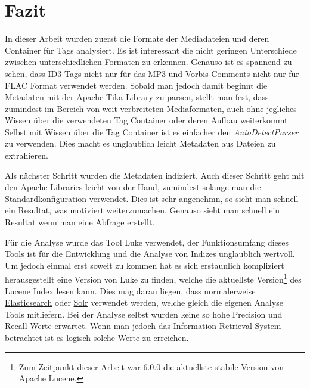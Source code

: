 \chapter{Fazit}
In dieser Arbeit wurden zuerst die Formate der Mediadateien
und deren Container für Tags analysiert. Es ist interessant
die nicht geringen Unterschiede zwischen unterschiedlichen
Formaten zu erkennen. Genauso ist es spannend zu sehen,
dass ID3 Tags nicht nur für das MP3 und Vorbis Comments nicht
nur für FLAC Format verwendet werden. Sobald man jedoch damit
beginnt die Metadaten mit der Apache Tika Library zu parsen,
stellt man fest, dass zumindest im Bereich von weit verbreiteten
Mediaformaten, auch ohne jegliches Wissen über die verwendeten
Tag Container oder deren Aufbau weiterkommt. Selbst mit
Wissen über die Tag Container ist es einfacher den
\emph{AutoDetectParser} zu verwenden. Dies macht es
unglaublich leicht Metadaten aus Dateien zu extrahieren.

Als nächster Schritt wurden die Metadaten indiziert.
Auch dieser Schritt geht mit den Apache Libraries leicht von
der Hand, zumindest solange man die Standardkonfiguration verwendet.
Dies ist sehr angenehmn, so sieht man schnell
ein Resultat, was motiviert weiterzumachen. Genauso
sieht man schnell ein Resultat wenn man eine Abfrage erstellt.

Für die Analyse wurde das Tool Luke verwendet, der Funktionsumfang
dieses Tools ist für die Entwicklung und die Analyse von
Indizes unglaublich wertvoll. Um jedoch einmal erst
soweit zu kommen hat es sich erstaunlich kompliziert
herausgestellt eine Version von Luke zu finden, welche
die aktuellste Version\footnote{Zum Zeitpunkt dieser Arbeit war 6.0.0
die aktuellste stabile Version von Apache Lucene.} des
Lucene Index lesen kann. Dies mag daran liegen, dass
normalerweise \href{https://www.elastic.co/products/elasticsearch}{Elasticsearch}
oder \href{https://lucene.apache.org/solr/}{Solr} verwendet
werden, welche gleich die eigenen Analyse Tools mitliefern.
Bei der Analyse selbst wurden keine so hohe Precision und Recall
Werte erwartet. Wenn man jedoch das Information Retrieval System
betrachtet ist es logisch solche Werte zu erreichen.

